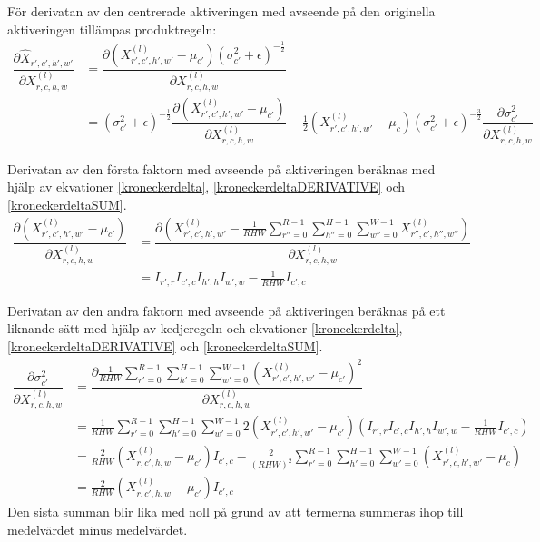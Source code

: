 \documentclass[a4paper,11pt,twoside]{article}
\newcommand*{\pd}[2]{\ensuremath{\dfrac{\partial #1}{\partial #2}}}
\begin{document}
För derivatan av den centrerade aktiveringen med avseende på den originella aktiveringen tillämpas produktregeln: \cite{webBN1} \cite{webBN2}
\begin{equation}\label{BN_kedjeregeln}
\begin{split}
\pd{\hat{X}_{r',c',h',w'}}{{X}^{(l)}_{r,c,h,w}} 
	& = \pd{(X^{(l)}_{r',c',h',w'} - \mu_{c'}){(\sigma^2_{c'} + \epsilon)}^{-\frac{1}{2}}}{{X}^{(l)}_{r,c,h,w}} \\
	& = {(\sigma^2_{c'} + \epsilon)}^{-\frac{1}{2}} \pd{(X^{(l)}_{r',c',h',w'} - \mu_{c'})}{{X}^{(l)}_{r,c,h,w}} - \frac{1}{2}(X^{(l)}_{r',c',h',w'} - \mu_c){(\sigma^2_{c'} + \epsilon)}^{-\frac{3}{2}} \pd{\sigma^2_{c'}}{{X}^{(l)}_{r,c,h,w}}
\end{split}
\end{equation}

Derivatan av den första faktorn med avseende på aktiveringen beräknas med hjälp av ekvationer \eqref{kroneckerdelta}, \eqref{kroneckerdeltaDERIVATIVE} och \eqref{kroneckerdeltaSUM}. \cite{webBN1} \cite{webBN2}
\begin{equation}\label{mu'}
\begin{split}
\pd{(X^{(l)}_{r',c',h',w'} - \mu_{c'})}{{X}^{(l)}_{r,c,h,w}}
	& = \pd{({X^{(l)}_{r',c',h',w'} - \frac{1}{RHW} \sum\limits^{R-1}_{r''=0} \sum\limits^{H-1}_{h''=0} \sum\limits^{W-1}_{w''=0} X^{(l)}_{r'',c',h'',w''}})}{{X}^{(l)}_{r,c,h,w}} \\
	& = I_{r',r} I_{c',c} I_{h',h} I_{w',w} - \frac{1}{RHW} I_{c',c}
\end{split}
\end{equation}

Derivatan av den andra faktorn med avseende på aktiveringen beräknas på ett liknande sätt med hjälp av kedjeregeln och ekvationer \eqref{kroneckerdelta}, \eqref{kroneckerdeltaDERIVATIVE} och \eqref{kroneckerdeltaSUM}. \cite{webBN1} \cite{webBN2}
\begin{equation}\label{sigma'}
\begin{split}
\pd{\sigma^2_{c'}}{{X}^{(l)}_{r,c,h,w}}
	& = \pd{\frac{1}{RHW} \sum\limits^{R-1}_{r'=0} \sum\limits^{H-1}_{h'=0} \sum\limits^{W-1}_{w'=0} ({X^{(l)}_{r',c',h',w'} - \mu_{c'}})^2}{{X}^{(l)}_{r,c,h,w}} \\
	& = \frac{1}{RHW} \sum\limits^{R-1}_{r'=0} \sum\limits^{H-1}_{h'=0} \sum\limits^{W-1}_{w'=0} 2 ({X^{(l)}_{r',c',h',w'} - \mu_{c'}}) (I_{r',r} I_{c',c} I_{h',h} I_{w',w} - \frac{1}{RHW} I_{c',c}) \\
	& = \frac{2}{RHW} ({X^{(l)}_{r,c',h,w} - \mu_{c'}})I_{c',c} - \frac{2}{(RHW)^2}  \sum\limits^{R-1}_{r'=0} \sum\limits^{H-1}_{h'=0} \sum\limits^{W-1}_{w'=0} ({X^{(l)}_{r',c,h',w'} - \mu_{c}}) \\
	& = \frac{2}{RHW} ({X^{(l)}_{r,c',h,w} - \mu_{c'}})I_{c',c}
\end{split}
\end{equation}
Den sista summan blir lika med noll på grund av att termerna summeras ihop till medelvärdet minus medelvärdet. 
\end{document}
